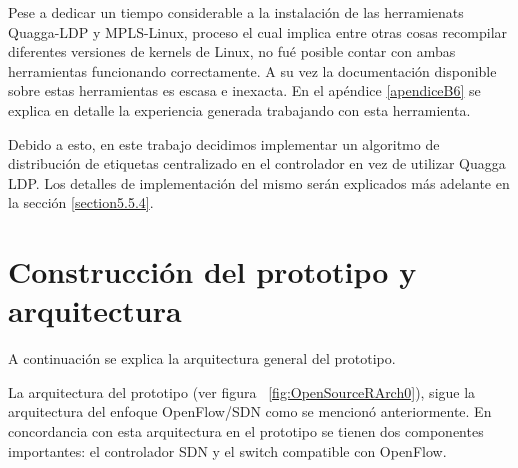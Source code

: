 Pese a dedicar un tiempo considerable a la instalaci\'on de las herramienats Quagga-LDP y MPLS-Linux, proceso el cual implica entre otras cosas recompilar diferentes versiones de kernels de Linux, no fu\'e posible contar con ambas herramientas funcionando correctamente. A su vez la documentaci\'on disponible sobre estas herramientas es escasa e inexacta. En el apéndice \ref{apendiceB6} se explica en detalle la experiencia generada trabajando con esta herramienta.



Debido a esto, en este trabajo decidimos implementar un algoritmo de distribución de etiquetas centralizado en el controlador en vez de utilizar Quagga LDP. Los detalles de implementaci\'on del mismo ser\'an explicados m\'as adelante en la sección \ref{section5.5.4}.\\

\section{Construcci\'on del prototipo y arquitectura}

A continuación se explica la arquitectura general del prototipo. 

La arquitectura del prototipo (ver figura ~\ref{fig:OpenSourceRArch0}), sigue la arquitectura del enfoque OpenFlow/SDN como se mencion\'o anteriormente. En concordancia con esta arquitectura en el prototipo se tienen dos componentes importantes: el controlador SDN y el switch compatible con OpenFlow.\\


